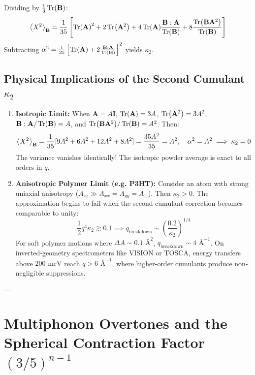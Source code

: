 \documentclass[11pt,a4paper]{article}
\theoremstyle{definition}
\begin{document}
Dividing by $\frac{1}{3}\Tr(\mathbf{B})$:
\begin{equation}
\ev{X^2}_{\mathbf{B}} = \frac{1}{35} \left[ \Tr(\mathbf{A})^2 + 2 \Tr(\mathbf{A}^2) + 4 \Tr(\mathbf{A}) \frac{\mathbf{B}:\mathbf{A}}{\Tr(\mathbf{B})} + 8 \frac{\Tr(\mathbf{B}\mathbf{A}^2)}{\Tr(\mathbf{B})} \right]
\end{equation}
Subtracting $\alpha^2 = \frac{1}{25} \left[ \Tr(\mathbf{A}) + 2 \frac{\mathbf{B}:\mathbf{A}}{\Tr(\mathbf{B})} \right]^2$ yields $\kappa_2$.

\subsection{Physical Implications of the Second Cumulant \texorpdfstring{$\kappa_2$}{kappa2}}
\begin{enumerate}
    \item \textbf{Isotropic Limit:} When $\mathbf{A} = A \mathbf{I}$, $\Tr(\mathbf{A}) = 3A$, $\Tr(\mathbf{A}^2) = 3A^2$, $\mathbf{B}:\mathbf{A}/\Tr(\mathbf{B}) = A$, and $\Tr(\mathbf{B}\mathbf{A}^2)/\Tr(\mathbf{B}) = A^2$.
    Then:
    \begin{equation}
    \ev{X^2}_{\mathbf{B}} = \frac{1}{35} [9A^2 + 6A^2 + 12A^2 + 8A^2] = \frac{35A^2}{35} = A^2, \quad \alpha^2 = A^2 \implies \kappa_2 = 0
    \end{equation}
    The variance vanishes identically! The isotropic powder average is exact to all orders in $q$.

    \item \textbf{Anisotropic Polymer Limit (e.g. P3HT):} Consider an atom with strong uniaxial anisotropy ($A_{zz} \gg A_{xx} = A_{yy} = A_\perp$). Then $\kappa_2 > 0$. The approximation begins to fail when the second cumulant correction becomes comparable to unity:
    \begin{equation}
    \frac{1}{2} q^4 \kappa_2 \gtrsim 0.1 \implies q_{\text{breakdown}} \sim \left( \frac{0.2}{\kappa_2} \right)^{1/4}
    \end{equation}
    For soft polymer motions where $\Delta A \sim 0.1\text{ \AA}^2$, $q_{\text{breakdown}} \sim 4\text{ \AA}^{-1}$. On inverted-geometry spectrometers like VISION or TOSCA, energy transfers above $200\text{ meV}$ reach $q > 6\text{ \AA}^{-1}$, where higher-order cumulants produce non-negligible suppressions.
\end{enumerate}

---

\section{Multiphonon Overtones and the Spherical Contraction Factor \texorpdfstring{$(3/5)^{n-1}$}{(3/5)**(n-1)}}
\label{sec:multiphonon}
\end{document}
